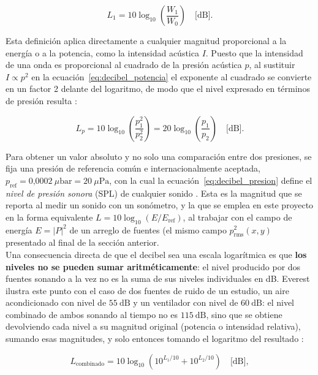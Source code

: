 \begin{equation}
L_1 = 10 \log_{10}\!\left(\frac{W_1}{W_0}\right) \quad \text{[dB]}.
\label{eq:decibel_potencia}
\end{equation}

Esta definición aplica directamente a cualquier magnitud proporcional
a la energía o a la potencia, como la intensidad acústica \(I\). Puesto
que la intensidad de una onda es proporcional al cuadrado de la
presión acústica \(p\), al sustituir \(I\propto p^2\) en la
ecuación~\eqref{eq:decibel_potencia} el exponente al cuadrado se
convierte en un factor 2 delante del logaritmo, de modo que el nivel
expresado en términos de presión resulta \cite[pág.~27]{everest2001}:

\begin{equation}
L_p = 10 \log_{10}\!\left(\frac{p_1^2}{p_2^2}\right)
    = 20 \log_{10}\!\left(\frac{p_1}{p_2}\right) \quad \text{[dB]}.
\label{eq:decibel_presion}
\end{equation}

Para obtener un valor absoluto y no solo una comparación entre dos
presiones, se fija una presión de referencia común e
internacionalmente aceptada,
\(p_{\text{ref}}=0\text{,}0002\ \mu\text{bar}=20\ \mu\text{Pa}\), con la
cual la ecuación~\eqref{eq:decibel_presion} define el \emph{nivel de
presión sonora} (SPL) de cualquier sonido \cite[pág.~28]{everest2001}. Esta es
la magnitud que se reporta al medir un sonido con un sonómetro, y la
que se emplea en este proyecto en la forma equivalente
\(L=10\log_{10}(E/E_{\text{ref}})\), al trabajar con el campo de energía
\(E=|P|^2\) de un arreglo de fuentes (el mismo campo
\(p_{\text{rms}}^2(x,y)\) presentado al final de la sección anterior.\\

Una consecuencia directa de que el decibel sea una escala logarítmica
es que \textbf{los niveles no se pueden sumar aritméticamente}: el
nivel producido por dos fuentes sonando a la vez no es la suma de sus
niveles individuales en dB. Everest ilustra este punto con el caso de
dos fuentes de ruido de un estudio, un aire acondicionado con nivel de
\(55\ \text{dB}\) y un ventilador con nivel de \(60\ \text{dB}\): el nivel
combinado de ambos sonando al tiempo no es \(115\ \text{dB}\), sino que
se obtiene devolviendo cada nivel a su magnitud original (potencia o
intensidad relativa), sumando esas magnitudes, y solo entonces
tomando el logaritmo del resultado \cite[pág.~36]{everest2001}:

\begin{equation}
L_{\text{combinado}} = 10 \log_{10}\!\left(10^{L_1/10} + 10^{L_2/10}\right)
\quad \text{[dB]},
\label{eq:combinar_db}
\end{equation}

